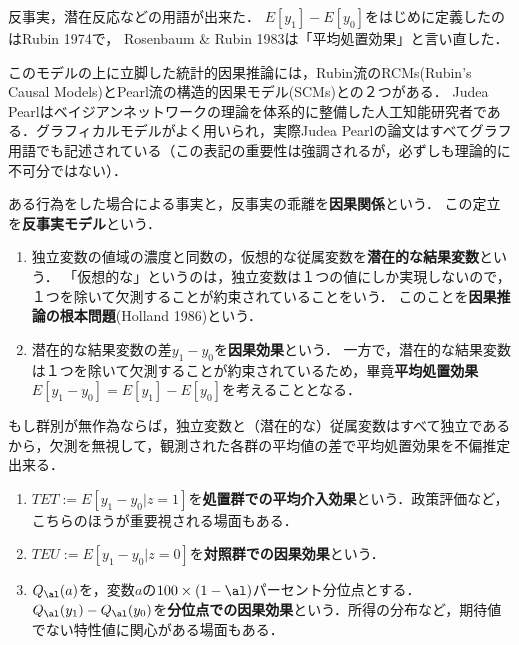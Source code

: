 \documentclass[uplatex,dvipdfmx]{jsreport}
\begin{document}
\begin{tcolorbox}[colframe=ForestGreen, colback=ForestGreen!10!white,breakable,colbacktitle=ForestGreen!40!white,coltitle=black,fonttitle=\bfseries\sffamily,
    title=]
    反事実，潜在反応などの用語が出来た．
    $E[y_1]-E[y_0]$をはじめに定義したのはRubin 1974で，
    Rosenbaum \& Rubin 1983は「平均処置効果」と言い直した．

    このモデルの上に立脚した統計的因果推論には，Rubin流のRCMs(Rubin's Causal Models)とPearl流の構造的因果モデル(SCMs)との２つがある．
    Judea Pearlはベイジアンネットワークの理論を体系的に整備した人工知能研究者である．グラフィカルモデルがよく用いられ，実際Judea Pearlの論文はすべてグラフ用語でも記述されている（この表記の重要性は強調されるが，必ずしも理論的に不可分ではない）．
\end{tcolorbox}

\begin{axiom}
    ある行為をした場合による事実と，反事実の乖離を\textbf{因果関係}という．
    この定立を\textbf{反事実モデル}という．
\end{axiom}

\begin{definition}\mbox{}
    \begin{enumerate}
        \item 独立変数の値域の濃度と同数の，仮想的な従属変数を\textbf{潜在的な結果変数}という．
        「仮想的な」というのは，独立変数は１つの値にしか実現しないので，１つを除いて欠測することが約束されていることをいう．
        このことを\textbf{因果推論の根本問題}(Holland 1986)という．
        \item 潜在的な結果変数の差$y_1-y_0$を\textbf{因果効果}という．
        一方で，潜在的な結果変数は１つを除いて欠測することが約束されているため，畢竟\textbf{平均処置効果}$E[y_1-y_0]=E[y_1]-E[y_0]$を考えることとなる．
    \end{enumerate}
\end{definition}
\begin{remark}
    もし群別が無作為ならば，独立変数と（潜在的な）従属変数はすべて独立であるから，欠測を無視して，観測された各群の平均値の差で平均処置効果を不偏推定出来る．
\end{remark}

\begin{definition}\mbox{}
    \begin{enumerate}
        \item $TET:=E[y_1-y_0|z=1]$を\textbf{処置群での平均介入効果}という．政策評価など，こちらのほうが重要視される場面もある．
        \item $TEU:=E[y_1-y_0|z=0]$を\textbf{対照群での因果効果}という．
        \item $Q_\al(a)$を，変数$a$の$100\times(1-\al)$パーセント分位点とする．$Q_\al(y_1)-Q_\al(y_0)$を\textbf{分位点での因果効果}という．所得の分布など，期待値でない特性値に関心がある場面もある．
    \end{enumerate}
\end{definition}
\end{document}
